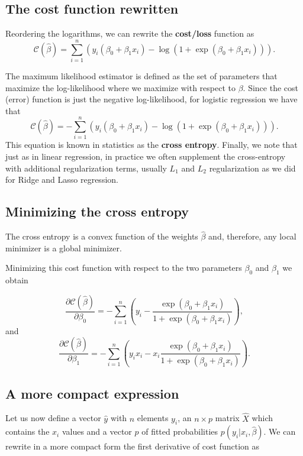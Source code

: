 \documentclass[%
oneside,                 %
final,                   %
10pt]{article}
\begin{document}
\subsection{The cost function rewritten}

Reordering the logarithms, we can rewrite the \textbf{cost/loss} function as
\[
\mathcal{C}(\hat{\beta}) = \sum_{i=1}^n  \left(y_i(\beta_0+\beta_1x_i) -\log{(1+\exp{(\beta_0+\beta_1x_i)})}\right).
\]

The maximum likelihood estimator is defined as the set of parameters that maximize the log-likelihood where we maximize with respect to $\beta$.
Since the cost (error) function is just the negative log-likelihood, for logistic regression we have that
\[
\mathcal{C}(\hat{\beta})=-\sum_{i=1}^n  \left(y_i(\beta_0+\beta_1x_i) -\log{(1+\exp{(\beta_0+\beta_1x_i)})}\right).
\]
This equation is known in statistics as the \textbf{cross entropy}. Finally, we note that just as in linear regression, 
in practice we often supplement the cross-entropy with additional regularization terms, usually $L_1$ and $L_2$ regularization as we did for Ridge and Lasso regression.

\subsection{Minimizing the cross entropy}

The cross entropy is a convex function of the weights $\hat{\beta}$ and,
therefore, any local minimizer is a global minimizer. 


Minimizing this
cost function with respect to the two parameters $\beta_0$ and $\beta_1$ we obtain

\[
\frac{\partial \mathcal{C}(\hat{\beta})}{\partial \beta_0} = -\sum_{i=1}^n  \left(y_i -\frac{\exp{(\beta_0+\beta_1x_i)}}{1+\exp{(\beta_0+\beta_1x_i)}}\right),
\]
and 
\[
\frac{\partial \mathcal{C}(\hat{\beta})}{\partial \beta_1} = -\sum_{i=1}^n  \left(y_ix_i -x_i\frac{\exp{(\beta_0+\beta_1x_i)}}{1+\exp{(\beta_0+\beta_1x_i)}}\right).
\]

\subsection{A more compact expression}

Let us now define a vector $\hat{y}$ with $n$ elements $y_i$, an
$n\times p$ matrix $\hat{X}$ which contains the $x_i$ values and a
vector $\hat{p}$ of fitted probabilities $p(y_i\vert x_i,\hat{\beta})$. We can rewrite in a more compact form the first
derivative of cost function as
\end{document}
